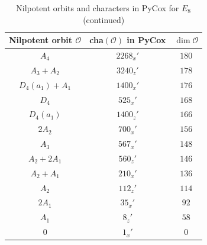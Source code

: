 \documentclass[reqno,12pt]{amsart}
\numberwithin{equation}{section}
\theoremstyle{plain}
\theoremstyle{definition}
\begin{document}
\begin{table}[htbp]\caption{Nilpotent orbits and characters in PyCox for $ E_8$ (continued) }
\label{tabchare8-1}
\centering
\renewcommand{\arraystretch}{1.3}
\setlength\tabcolsep{5pt}
{ \begin{tabular}{|c|c|c|}
\hline Nilpotent orbit $\mathcal{O}$ & cha$(\mathcal{O})$ in PyCox & $\dim \mathcal{O}$ \\ \hline

$A_4$ & $2268_x'$ & $180$ \\\hline
$A_3+A_2$ & $3240_z'$ & $178$ \\
\hline
$D_4(a_1)+A_1$ & $1400_x'$ & $176$ \\
\hline
$D_4$ & $525_x'$ & $168$ \\
\hline
$D_4(a_1)$ & $1400_z'$ & $166$ \\
\hline
$2A_2$ & $700_x'$ & $156$ \\
\hline
$A_3$ & $567_x'$ & $148$ \\
\hline
$A_2+2A_1$ & $560_z'$ & $146$ \\
\hline
$A_2+A_1$ & $210_x'$ & $136$ \\
\hline
$A_2$ & $112_z'$ & $114$ \\
\hline
$2A_1$ & $35_x'$ & $92$ \\
\hline
$A_1$ & $8_z'$ & $58$ \\
\hline
$0$ & $1_x'$ & $0$ \\
\hline

\end{tabular}}
\bigskip
\end{table}
\end{document}
